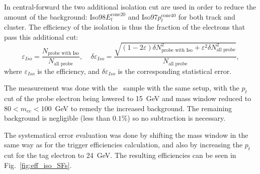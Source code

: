 In \Zee central-forward the two additional isolation cut are used in order to reduce the amount of the background: Iso98$E_{t}^{\mathrm{cone20}}$ and Iso97$p_{t}^{\mathrm{cone40}}$ for both track and cluster. The efficiency of the isolation is thus the fraction of the electrons that pass this additional cut:
\begin{equation}
\varepsilon_{Iso} = \frac{N_\text{probe with Iso} }{ N_\text{all probe} }, \;\;\;\;
\delta \varepsilon_{Iso} = \frac{\sqrt{(1-2\varepsilon) \delta N_\text{probe with Iso}^2 + \varepsilon^2 \delta N_\text{all probe}^2}}
                                {N_\text{all probe}},
\end{equation}
where $\varepsilon_{Iso}$ is the efficiency, and $\delta \varepsilon_{Iso}$ is the corresponding statistical error.

The measurement was done with the \Zee\ sample with the same setup, with the $p_{t}$ cut of the probe electron being lowered to 15~GeV and mass window reduced to $80 < m_{ee} < 100$~GeV to remedy the increased background. The remaining background is negligible (less than $0.1$\%) so no subtraction is necessary.

The systematical error evaluation was done by shifting the mass window in the same way as for the trigger efficiencies calculation, and also by increasing the $p_{t}$ cut for the tag electron to 24~GeV. The resulting efficiencies can be seen in Fig.~\ref{fig:eff_iso_SFs}.

\begin{figure}
\end{figure}
